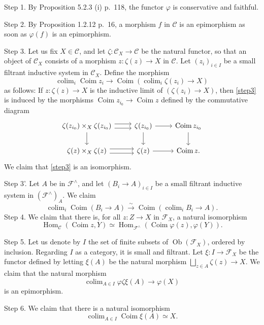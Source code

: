\documentclass[12pt]{article}%
\theoremstyle{remark}
\theoremstyle{definition}
\newcommand{\C}{\mathcal C}
\newcommand{\F}{\mathcal F}
\DeclareMathOperator*{\colim}{colim}
\DeclareMathOperator{\Coim}{Coim}
\DeclareMathOperator{\Hom}{Hom}%
\DeclareMathOperator{\Ob}{Ob}
\begin{document}
\noindent Step 1. By Proposition 5.2.3 (i) p.~118, the functor $\varphi$ is conservative and faithful.

\noindent Step 2. By Proposition 1.2.12 p.~16, a morphism $f$ in $\C$ is an epimorphism as soon as $\varphi(f)$ is an epimorphism.

\noindent Step 3. Let us fix $X\in\C$, and let $\zeta:\C_X\to\C$ be the natural functor, so that an object of $\C_X$ consists of a morphism $z:\zeta(z)\to X$ in $\C$. Let $(z_i)_{i\in I}$ be a small filtrant inductive system in $\C_X$. Define the morphism
% 
\begin{equation}\label{step3}
\colim_i\Coim z_i\to\Coim\left(\colim_i\zeta(z_i)\to X\right)
\end{equation}
%
as follows: If $z:\zeta(z)\to X$ is the inductive limit of $(\zeta(z_i)\to X)$, then \eqref{step3} is induced by the morphisms $\Coim z_{i_0}\to\Coim z$ defined by the commutative diagram 
$$
\begin{tikzcd}
\zeta(z_{i_0})\times_X\zeta(z_{i_0})\ar{d}\ar[yshift=0.7ex]{r}\ar[yshift=-0.7ex]{r}&\zeta(z_{i_0})\ar{d}\ar{r}&\Coim z_{i_0}\ar{d}\\ 
\zeta(z)\times_X\zeta(z)\ar[yshift=0.7ex]{r}\ar[yshift=-0.7ex]{r}&\zeta(z)\ar{r}&\Coim z.
\end{tikzcd}
$$ 
We claim that \eqref{step3} is an isomorphism.

\noindent Step 3'. Let $A$ be in $\F^\wedge$, and let $(B_i\to A)_{i\in I}$ be a small filtrant inductive system in $(\F^\wedge)_A$. We claim 
$$
\colim_i\Coim(B_i\to A)\xrightarrow{\sim}
\Coim\left(\colim_iB_i\to A\right).
$$
Step 4. We claim that there is, for all $z:Z\to X$ in $\F_X$, a natural isomorphism 
$$
\Hom_\C(\Coim z,Y)\simeq\Hom_{\F^\wedge}(\Coim\varphi(z),\varphi(Y)).
$$ 

\noindent Step 5. Let us denote by $I$ the set of finite subsets of $\Ob(\F_X)$, ordered by inclusion. Regarding $I$ as a category, it is small and filtrant. Let $\xi:I\to\F_X$ be the functor defined by letting $\xi(A)$ be the natural morphism $\bigsqcup_{z\in A}\zeta(z)\to X$. We claim that the natural morphism 
$$
\colim_{A\in I}\varphi\zeta\xi(A)\to\varphi(X) 
$$ 
is an epimorphism.

\noindent Step 6. We claim that there is a natural isomorphism 
$$
\colim_{A\in I}\Coim\xi(A)\simeq X. 
$$
\end{document}
